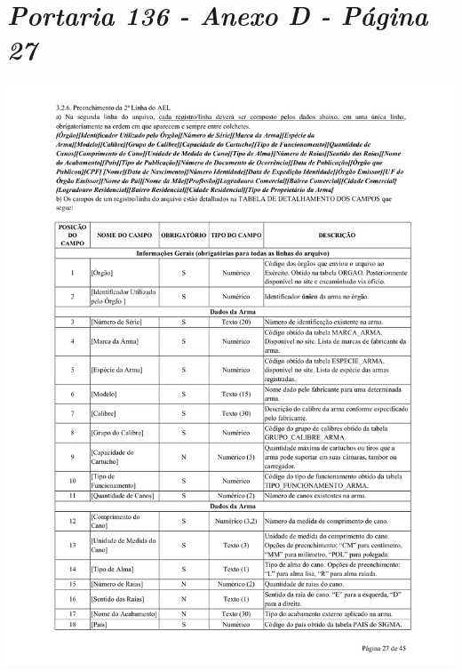 \chapter{\textit{Portaria 136 - Anexo D - Página 27}}
\includegraphics[scale=0.8]{imagens/AnexoA2-AnexoD-portaria-136}


